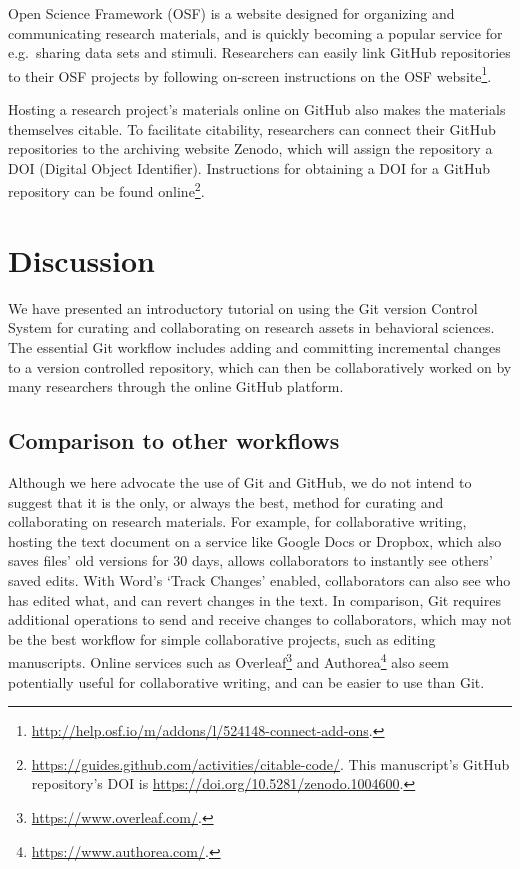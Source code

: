 \documentclass[
  american,
  ,doc,floatsintext]{apa6}
\begin{document}
Open Science Framework (OSF) is a website designed for organizing and communicating research materials, and is quickly becoming a popular service for e.g.~sharing data sets and stimuli. Researchers can easily link GitHub repositories to their OSF projects by following on-screen instructions on the OSF website\footnote{\url{http://help.osf.io/m/addons/l/524148-connect-add-ons}.}.

Hosting a research project's materials online on GitHub also makes the materials themselves citable. To facilitate citability, researchers can connect their GitHub repositories to the archiving website Zenodo, which will assign the repository a DOI (Digital Object Identifier). Instructions for obtaining a DOI for a GitHub repository can be found online\footnote{\url{https://guides.github.com/activities/citable-code/}. This manuscript's GitHub repository's DOI is \url{https://doi.org/10.5281/zenodo.1004600}.}.

\hypertarget{discussion}{%
\section{Discussion}\label{discussion}}

We have presented an introductory tutorial on using the Git version Control System for curating and collaborating on research assets in behavioral sciences. The essential Git workflow includes adding and committing incremental changes to a version controlled repository, which can then be collaboratively worked on by many researchers through the online GitHub platform.

\hypertarget{comparison-to-other-workflows}{%
\subsection{Comparison to other workflows}\label{comparison-to-other-workflows}}

Although we here advocate the use of Git and GitHub, we do not intend to suggest that it is the only, or always the best, method for curating and collaborating on research materials. For example, for collaborative writing, hosting the text document on a service like Google Docs or Dropbox, which also saves files' old versions for 30 days, allows collaborators to instantly see others' saved edits. With Word's `Track Changes' enabled, collaborators can also see who has edited what, and can revert changes in the text. In comparison, Git requires additional operations to send and receive changes to collaborators, which may not be the best workflow for simple collaborative projects, such as editing manuscripts. Online services such as Overleaf\footnote{\url{https://www.overleaf.com/}.} and Authorea\footnote{\url{https://www.authorea.com/}.} also seem potentially useful for collaborative writing, and can be easier to use than Git.
\end{document}

